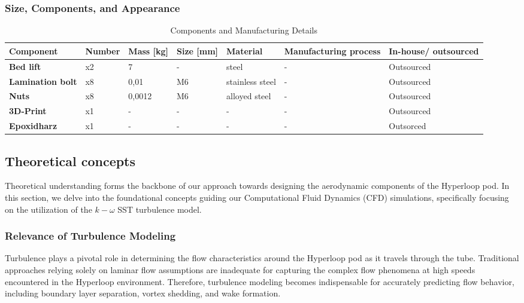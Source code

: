 \subsubsection{Size, Components, and Appearance}

\begin{table}[ht]
\centering

\label{table:components}
\begin{adjustbox}{width=\textwidth,center}
\begin{tabular}{|>{\bfseries}m{2.5cm}|m{1.4cm}|m{1.7cm}|m{2.1cm}|m{2.2cm}|m{2.6cm}|m{2.2cm}|}
\hline
Component & Number & Mass [kg] & Size [mm] & Material & Manufacturing process & In-house/ outsourced \\
\hline
Bed lift & x2 & 7 & - & steel & - & Outsourced \\
Lamination bolt & x8 & 0,01 & M6 & stainless steel & - & Outsourced \\
Nuts & x8 & 0,0012 & M6 & alloyed steel & - & Outsourced \\
3D-Print & x1 & - & - & - & - & Outsourced \\
Epoxidharz & x1 & - & - & - & -& Outsorced \\
\hline

\end{tabular}
\end{adjustbox}
\caption{Components and Manufacturing Details}
\end{table}



\subsection{Theoretical concepts}

Theoretical understanding forms the backbone of our approach towards designing the aerodynamic components of the Hyperloop pod. In this section, we delve into the foundational concepts guiding our Computational Fluid Dynamics (CFD) simulations, specifically focusing on the utilization of the \(k-\omega\) SST turbulence model.

\subsubsection{Relevance of Turbulence Modeling}

Turbulence plays a pivotal role in determining the flow characteristics around the Hyperloop pod as it travels through the tube. Traditional approaches relying solely on laminar flow assumptions are inadequate for capturing the complex flow phenomena at high speeds encountered in the Hyperloop environment. Therefore, turbulence modeling becomes indispensable for accurately predicting flow behavior, including boundary layer separation, vortex shedding, and wake formation.

